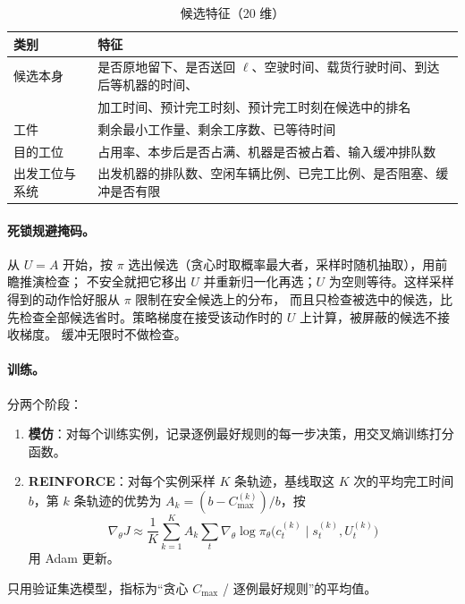 \documentclass[11pt,a4paper]{ctexart}
\theoremstyle{definition}
\theoremstyle{remark}
\newcommand{\LU}{\ell}
\begin{document}
\begin{table}[ht]
\centering
\caption{候选特征（20 维）}
\label{tab:features}
\small
\begin{tabular}{ll}
\toprule
类别 & 特征 \\
\midrule
候选本身 & 是否原地留下、是否送回 $\LU$、空驶时间、载货行驶时间、到达后等机器的时间、\\
         & 加工时间、预计完工时刻、预计完工时刻在候选中的排名 \\
工件 & 剩余最小工作量、剩余工序数、已等待时间 \\
目的工位 & 占用率、本步后是否占满、机器是否被占着、输入缓冲排队数 \\
出发工位与系统 & 出发机器的排队数、空闲车辆比例、已完工比例、是否阻塞、缓冲是否有限 \\
\bottomrule
\end{tabular}
\end{table}

\paragraph{死锁规避掩码。}从 $U=A$ 开始，按 $\pi$ 选出候选（贪心时取概率最大者，采样时随机抽取），用前瞻推演检查；
不安全就把它移出 $U$ 并重新归一化再选；$U$ 为空则等待。这样采样得到的动作恰好服从 $\pi$ 限制在安全候选上的分布，
而且只检查被选中的候选，比先检查全部候选省时。策略梯度在接受该动作时的 $U$ 上计算，被屏蔽的候选不接收梯度。
缓冲无限时不做检查。

\paragraph{训练。}分两个阶段：
\begin{enumerate}[nosep]
  \item \textbf{模仿}：对每个训练实例，记录逐例最好规则的每一步决策，用交叉熵训练打分函数。
  \item \textbf{REINFORCE}：对每个实例采样 $K$ 条轨迹，基线取这 $K$ 次的平均完工时间 $b$，第 $k$ 条轨迹的优势为
        $A_k=(b-C_{\max}^{(k)})/b$，按
        \begin{equation}
        \nabla_\theta J\approx\frac{1}{K}\sum_{k=1}^{K}A_k\sum_{t}\nabla_\theta\log\pi_\theta\bigl(c_t^{(k)}\mid s_t^{(k)},U_t^{(k)}\bigr)
        \end{equation}
        用 Adam 更新\cite{williams1992,kool2019,kwon2020}。
\end{enumerate}
只用验证集选模型，指标为“贪心 $C_{\max}$ / 逐例最好规则”的平均值。
\end{document}
